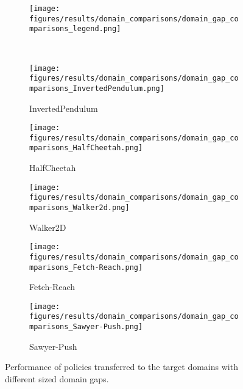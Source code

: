 \begin{figure*}[t]
    \centering
    \begin{subfigure}[t]{0.27\linewidth}    
        \texttt{[image: figures/results/domain\_comparisons/domain\_gap\_comparisons\_legend.png]}
    \end{subfigure}
    \\
    \begin{subfigure}[t]{0.19\linewidth}
        \texttt{[image: figures/results/domain\_comparisons/domain\_gap\_comparisons\_InvertedPendulum.png]}
        \caption{InvertedPendulum}
        \label{fig:result_all:invertedpendulum}
    \end{subfigure}
    \begin{subfigure}[t]{0.19\linewidth}
        \texttt{[image: figures/results/domain\_comparisons/domain\_gap\_comparisons\_HalfCheetah.png]}
        \caption{HalfCheetah}
        \label{fig:result_all:halfcheetah}
    \end{subfigure}
    \begin{subfigure}[t]{0.19\linewidth}
        \texttt{[image: figures/results/domain\_comparisons/domain\_gap\_comparisons\_Walker2d.png]}
        \caption{Walker2D}
        \label{fig:result_all:walker2d}
    \end{subfigure}
    \begin{subfigure}[t]{0.19\linewidth}
        \texttt{[image: figures/results/domain\_comparisons/domain\_gap\_comparisons\_Fetch-Reach.png]}
        \caption{Fetch-Reach}
        \label{fig:result_all:fetch_reach}
    \end{subfigure}
    \begin{subfigure}[t]{0.19\linewidth}
        \texttt{[image: figures/results/domain\_comparisons/domain\_gap\_comparisons\_Sawyer-Push.png]}
        \caption{Sawyer-Push}
        \label{fig:result_all:sawyer_push}
    \end{subfigure}
    \caption{
        Performance of policies transferred to the target domains with different sized domain gaps. 
    }
\label{fig:domain_exps}
\end{figure*}


